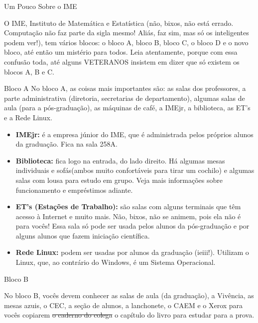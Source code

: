 \begin{secao}{Um Pouco Sobre o IME}

O IME, Instituto de Matemática e Estatística (não, bixos, não está errado.
Computação não faz parte da sigla mesmo! Aliás, faz sim, mas só os inteligentes
podem ver!), tem vários blocos: o bloco A, bloco B, bloco C, o bloco D e o
novo bloco, até então um mistério para todos. Leia atentamente, porque com essa
confusão toda, até alguns VETERANOS insistem em dizer que só existem os blocos
A, B e C.


\begin{subsecao}{Bloco A}
No bloco A, as coisas mais importantes são: as salas dos professores, a parte
administrativa (diretoria, secretarias de departamento), algumas salas de aula
(para a pós-graduação), as máquinas de café, a IMEjr, a biblioteca, as ET's e
a Rede Linux.

\begin{itemize}

\item {\bf IMEjr:} é a empresa júnior do IME, que é administrada pelos próprios
alunos da graduação. Fica na sala 258A.

\item {\bf Biblioteca:} fica logo na entrada, do lado direito. Há algumas mesas
individuais e sofás(ambos muito confortáveis para tirar um cochilo) e algumas salas
com lousa para estudo em grupo. Veja mais informações sobre funcionamento e
empréstimos adiante.

\item {\bf ET's (Estações de Trabalho):} são salas com alguns terminais que têm
acesso à Internet e muito mais. Não, bixos, não se animem, pois ela não é para
vocês! Essa sala só pode ser usada pelos alunos da pós-graduação e por alguns
alunos que fazem iniciação científica.

\item {\bf Rede Linux:} podem ser usadas por alunos da graduação (ieiii!).
Utilizam o Linux, que, ao contrário do Windows, é um Sistema Operacional.

\end{itemize}

\end{subsecao}

\begin{subsecao}{Bloco B}


No bloco B, vocês devem conhecer as salas de aula (da graduação), a Vivência, as
mesas azuis, o CEC, a seção de alunos, a lanchonete, o CAEM e o Xerox para vocês
copiarem \sout{o caderno do colega} o capítulo do livro para estudar para a prova.


\end{subsecao}
\end{secao}
